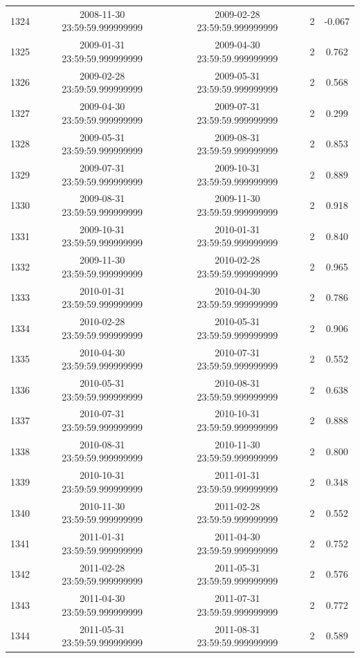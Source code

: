 \begin{table}
\begin{tabular}{lcccc}
1324 & 2008-11-30 23:59:59.999999999 & 2009-02-28 23:59:59.999999999 & 2 & -0.067 \\
1325 & 2009-01-31 23:59:59.999999999 & 2009-04-30 23:59:59.999999999 & 2 & 0.762 \\
1326 & 2009-02-28 23:59:59.999999999 & 2009-05-31 23:59:59.999999999 & 2 & 0.568 \\
1327 & 2009-04-30 23:59:59.999999999 & 2009-07-31 23:59:59.999999999 & 2 & 0.299 \\
1328 & 2009-05-31 23:59:59.999999999 & 2009-08-31 23:59:59.999999999 & 2 & 0.853 \\
1329 & 2009-07-31 23:59:59.999999999 & 2009-10-31 23:59:59.999999999 & 2 & 0.889 \\
1330 & 2009-08-31 23:59:59.999999999 & 2009-11-30 23:59:59.999999999 & 2 & 0.918 \\
1331 & 2009-10-31 23:59:59.999999999 & 2010-01-31 23:59:59.999999999 & 2 & 0.840 \\
1332 & 2009-11-30 23:59:59.999999999 & 2010-02-28 23:59:59.999999999 & 2 & 0.965 \\
1333 & 2010-01-31 23:59:59.999999999 & 2010-04-30 23:59:59.999999999 & 2 & 0.786 \\
1334 & 2010-02-28 23:59:59.999999999 & 2010-05-31 23:59:59.999999999 & 2 & 0.906 \\
1335 & 2010-04-30 23:59:59.999999999 & 2010-07-31 23:59:59.999999999 & 2 & 0.552 \\
1336 & 2010-05-31 23:59:59.999999999 & 2010-08-31 23:59:59.999999999 & 2 & 0.638 \\
1337 & 2010-07-31 23:59:59.999999999 & 2010-10-31 23:59:59.999999999 & 2 & 0.888 \\
1338 & 2010-08-31 23:59:59.999999999 & 2010-11-30 23:59:59.999999999 & 2 & 0.800 \\
1339 & 2010-10-31 23:59:59.999999999 & 2011-01-31 23:59:59.999999999 & 2 & 0.348 \\
1340 & 2010-11-30 23:59:59.999999999 & 2011-02-28 23:59:59.999999999 & 2 & 0.552 \\
1341 & 2011-01-31 23:59:59.999999999 & 2011-04-30 23:59:59.999999999 & 2 & 0.752 \\
1342 & 2011-02-28 23:59:59.999999999 & 2011-05-31 23:59:59.999999999 & 2 & 0.576 \\
1343 & 2011-04-30 23:59:59.999999999 & 2011-07-31 23:59:59.999999999 & 2 & 0.772 \\
1344 & 2011-05-31 23:59:59.999999999 & 2011-08-31 23:59:59.999999999 & 2 & 0.589 \\

\end{tabular}
\end{table}
